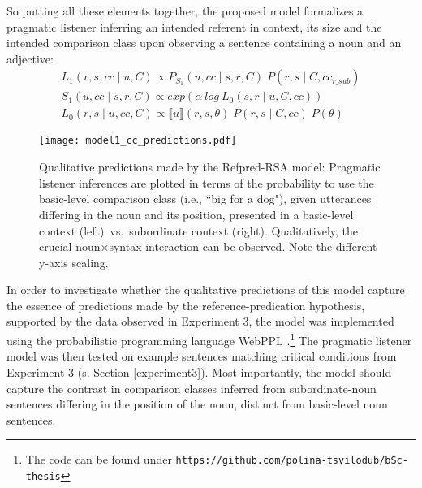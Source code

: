 So putting all these elements together, the proposed model formalizes a pragmatic listener inferring an intended referent in context, its size and the intended comparison class upon observing a sentence containing a noun and an adjective:
\begin{gather*}
	L_1 (r, s, cc \mid u, C) \propto P_{S_1} (u, cc \mid s, r, C) \; P(r, s \mid C, cc_{r\_sub}) \\
	S_1 (u, cc \mid s, r, C)  \propto exp(\alpha \: log \: L_0 (s, r \mid u, C, cc) ) \\
	L_0 (r, s \mid u, cc, C) \propto \llbracket u \rrbracket (r, s, \theta) \; P(r, s \mid C, cc) \; P(\theta)
\end{gather*}
 
\begin{figure*}[t]
 	\begin{center}
 		\texttt{[image: model1\_cc\_predictions.pdf]}%
 	\end{center}
 	\vspace{-0.3cm}
 	\caption{Qualitative predictions made by the Refpred-RSA model: Pragmatic listener inferences are plotted in terms of the probability to use the basic-level comparison class (i.e., ``big for a dog"), given utterances differing in the noun and its position, presented in a basic-level context (left)~vs.~subordinate context (right). Qualitatively, the crucial noun$\times$syntax interaction can be observed. Note the different y-axis scaling.}
 	\label{model1-cc-results}
 \end{figure*}
In order to investigate whether the qualitative predictions of this model capture the essence of predictions made by the reference-predication hypothesis, supported by the data observed in Experiment 3, the model was implemented using the probabilistic programming language WebPPL \parencite{dippl}.\footnote{The code can be found under \texttt{https://github.com/polina-tsvilodub/bSc-thesis}} The pragmatic listener model was then tested on example sentences matching critical conditions from Experiment 3 (s. Section \ref{experiment3}). Most importantly, the model should capture the contrast in comparison classes inferred from subordinate-noun sentences differing in the position of the noun, distinct from basic-level noun sentences.

